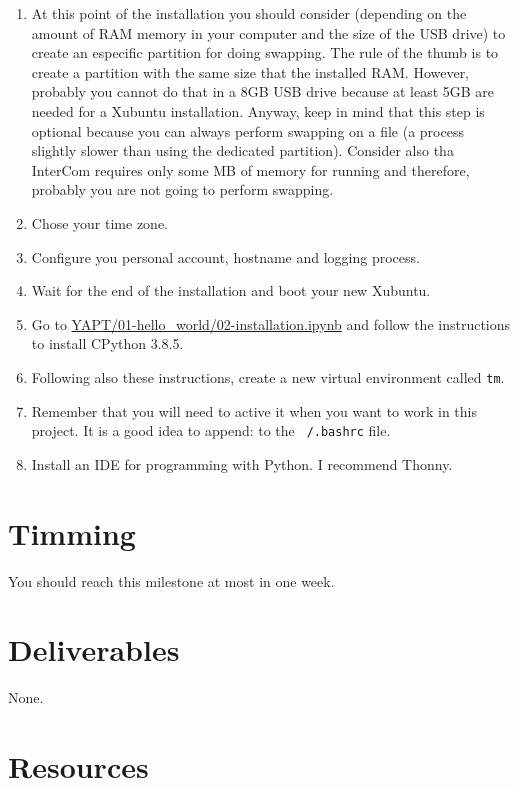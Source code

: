 \begin{enumerate}
\item At this point of the installation you should consider (depending
  on the amount of RAM memory in your computer and the size of the USB
  drive) to create an especific partition for doing swapping. The rule
  of the thumb is to create a partition with the same size that the
  installed RAM. However, probably you cannot do that in a 8GB USB
  drive because at least 5GB are needed for a Xubuntu
  installation. Anyway, keep in mind that this step is optional
  because you can always perform swapping on a file (a process
  slightly slower than using the dedicated partition). Consider also
  tha InterCom requires only some MB of memory for running and
  therefore, probably you are not going to perform swapping.

\item Chose your time zone.
  
\item Configure you personal account, hostname and logging process.
  
\item Wait for the end of the installation and boot your new Xubuntu.
  
\item Go to
  \href{https://github.com/vicente-gonzalez-ruiz/YAPT/blob/master/01-hello_world/02-installation.ipynb}{YAPT/01-hello\_world/02-installation.ipynb}
  \cite{YAPY} and follow the instructions to install CPython 3.8.5.
\item Following also these instructions, create a new virtual
  environment called \texttt{tm}.
\item Remember that you will need to active it when you want to work
  in this project. It is a good idea to append:
  to the \texttt{~/.bashrc} file.
\item Install an IDE for programming with Python. I recommend Thonny.
\end{enumerate}

\section{Timming}

You should reach this milestone at most in one week.

\section{Deliverables}

None.

\section{Resources}


